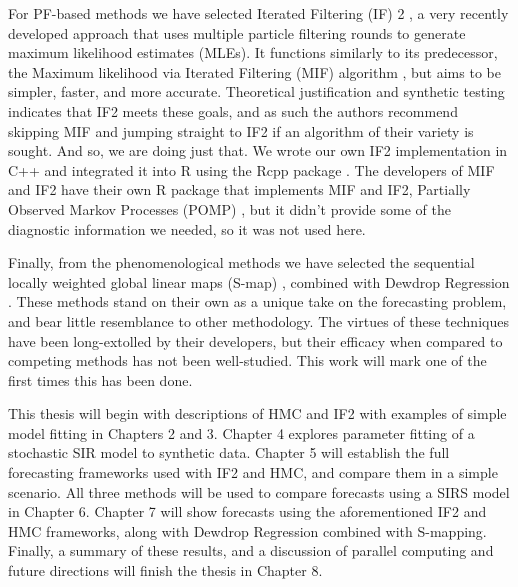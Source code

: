 For PF-based methods we have selected Iterated Filtering (IF) 2 \cite{Ionides2015}, a very recently developed approach that uses multiple particle filtering rounds to generate maximum likelihood estimates (MLEs). It functions similarly to its predecessor, the Maximum likelihood via Iterated Filtering (MIF) algorithm \cite{Ionides2006}, but aims to be simpler, faster, and more accurate. Theoretical justification and synthetic testing indicates that IF2 meets these goals, and as such the authors recommend skipping MIF and jumping straight to IF2 if an algorithm of their variety is sought. And so, we are doing just that. We wrote our own IF2 implementation in C++ and integrated it into R using the Rcpp package \cite{Eddelbuettel2011}. The developers of MIF and IF2 have their own R package that implements MIF and IF2, Partially Observed Markov Processes (POMP) \cite{King2015a}\cite{King2016}, but it didn't provide some of the diagnostic information we needed, so it was not used here.

Finally, from the phenomenological methods we have selected the sequential locally weighted global linear maps (S-map) \cite{Glaser2014}\cite{Hsieh2008}\cite{Sugihara1990}\cite{Sugihara1994}, combined with Dewdrop Regression \cite{Glaser2014}. These methods stand on their own as a unique take on the forecasting problem, and bear little resemblance to other methodology. The virtues of these techniques have been long-extolled by their developers, but their efficacy when compared to competing methods has not been well-studied. This work will mark one of the first times this has been done.

This thesis will begin with descriptions of HMC and IF2 with examples of simple model fitting in Chapters 2 and 3. Chapter 4 explores parameter fitting of a stochastic SIR model to synthetic data. Chapter 5 will establish the full forecasting frameworks used with IF2 and HMC, and compare them in a simple scenario. All three methods will be used to compare forecasts using a SIRS model in Chapter 6. Chapter 7 will show forecasts using the aforementioned IF2 and HMC frameworks, along with Dewdrop Regression combined with S-mapping. Finally, a summary of these results, and a discussion of parallel computing and future directions will finish the thesis in Chapter 8.